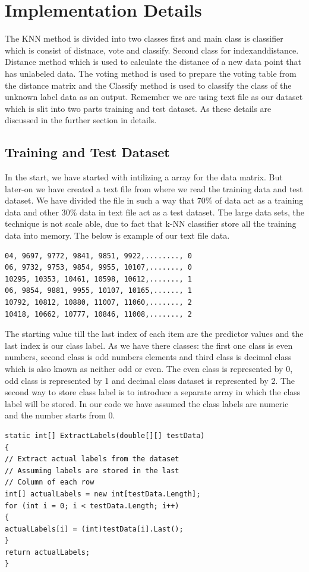 \documentclass[conference]{IEEEtran}
\begin{document}
\section{Implementation Details}
The KNN method is divided into two classes first and main class is classifier which is consist of distnace, vote and classify. Second class for indexanddistance. Distance method which is used to calculate the distance of a new data point that has unlabeled data. The voting method is used to prepare the voting table from the distance matrix and the Classify method is used to classify the class of the unknown label data as an output. Remember we are using text file as our dataset which is slit into two parts training and test dataset. As these details are discussed in the further section in details. 


\subsection{Training and Test Dataset}
In the start, we have started with intilizing a array for the data matrix. But later-on we have created a text file from where we read the training data and test dataset. We have divided the file in such a way that 70\% of data act as a training data and other 30\% data in text file act as a test dataset. The large data sets, the technique is not scale able, due to fact that k-NN classifier store all the training data into memory. The below is example of our text file data. 
\begin{lstlisting}
04, 9697, 9772, 9841, 9851, 9922,........, 0
06, 9732, 9753, 9854, 9955, 10107,......., 0
10295, 10353, 10461, 10598, 10612,......., 1
06, 9854, 9881, 9955, 10107, 10165,......, 1
10792, 10812, 10880, 11007, 11060,......., 2
10418, 10662, 10777, 10846, 11008,......., 2
\end{lstlisting}
The starting value till the last index of each item are the predictor values and the last index is our class label. As we have there classes: the first one class is even numbers, second class is odd numbers elements and third class is decimal class which is also known as neither odd or even. The even class is represented by 0, odd class is represented by 1 and decimal class dataset is represented by 2. The second way to store class label is to introduce a separate array in which the class label will be stored. In our code we have assumed the class labels are numeric and the number starts from 0. 
\begin{lstlisting}
static int[] ExtractLabels(double[][] testData)
{
// Extract actual labels from the dataset
// Assuming labels are stored in the last 
// Column of each row
int[] actualLabels = new int[testData.Length];
for (int i = 0; i < testData.Length; i++)
{
actualLabels[i] = (int)testData[i].Last();
}
return actualLabels;
}
\end{lstlisting}
\end{document}
